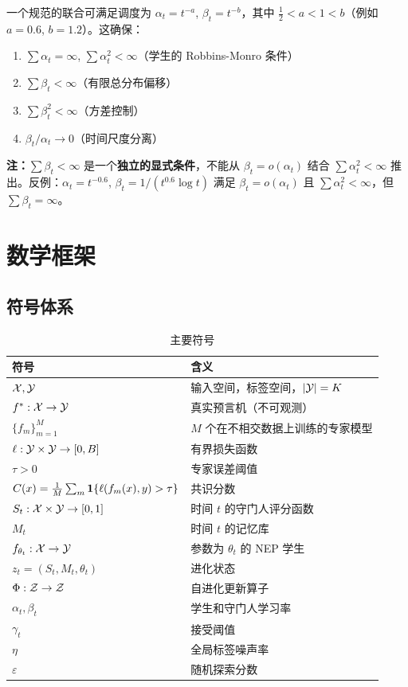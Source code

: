 一个规范的联合可满足调度为 $\alpha_t = t^{-a}$, $\beta_t = t^{-b}$，其中 $\frac{1}{2} < a < 1 < b$（例如 $a = 0.6$, $b = 1.2$）。这确保：
\begin{enumerate}[nosep, label=(\roman*)]
    \item $\sum \alpha_t = \infty$, $\sum \alpha_t^2 < \infty$（学生的 Robbins-Monro 条件）
    \item $\sum \beta_t < \infty$（有限总分布偏移）
    \item $\sum \beta_t^2 < \infty$（方差控制）
    \item $\beta_t/\alpha_t \to 0$（时间尺度分离）
\end{enumerate}

\textbf{注：}$\sum \beta_t < \infty$ 是一个\textbf{独立的显式条件}，不能从 $\beta_t = o(\alpha_t)$ 结合 $\sum \alpha_t^2 < \infty$ 推出。反例：$\alpha_t = t^{-0.6}$, $\beta_t = 1/(t^{0.6} \log t)$ 满足 $\beta_t = o(\alpha_t)$ 且 $\sum \alpha_t^2 < \infty$，但 $\sum \beta_t = \infty$。

\section{数学框架}

\subsection{符号体系}

\begin{table}[ht]
\centering
\caption{主要符号}
\label{tab:notation}
\begin{tabular}{@{}ll@{}}
\toprule
符号 & 含义 \\
\midrule
$\mathcal{X}, \mathcal{Y}$ & 输入空间，标签空间，$|\mathcal{Y}| = K$ \\
$f^*: \mathcal{X} \to \mathcal{Y}$ & 真实预言机（不可观测） \\
$\{f_m\}_{m=1}^M$ & $M$ 个在不相交数据上训练的专家模型 \\
$\ell: \mathcal{Y} \times \mathcal{Y} \to [0, B]$ & 有界损失函数 \\
$\tau > 0$ & 专家误差阈值 \\
$C(x) = \frac{1}{M}\sum_m \mathbf{1}\{\ell(f_m(x), y) > \tau\}$ & 共识分数 \\
$S_t: \mathcal{X} \times \mathcal{Y} \to [0,1]$ & 时间 $t$ 的守门人评分函数 \\
$M_t$ & 时间 $t$ 的记忆库 \\
$f_{\theta_t}: \mathcal{X} \to \mathcal{Y}$ & 参数为 $\theta_t$ 的 NEP 学生 \\
$z_t = (S_t, M_t, \theta_t)$ & 进化状态 \\
$\Phi: \mathcal{Z} \to \mathcal{Z}$ & 自进化更新算子 \\
$\alpha_t, \beta_t$ & 学生和守门人学习率 \\
$\gamma_t$ & 接受阈值 \\
$\eta$ & 全局标签噪声率 \\
$\varepsilon$ & 随机探索分数 \\
\bottomrule
\end{tabular}
\end{table}

